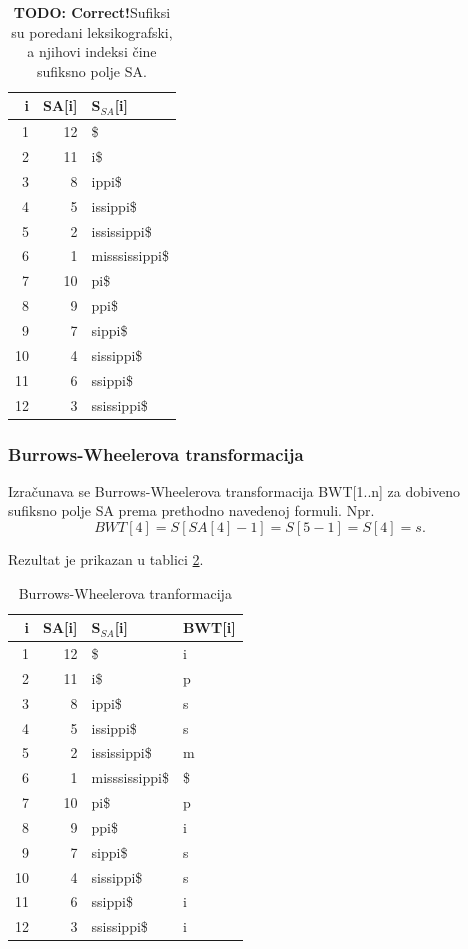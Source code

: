 \documentclass[a4paper,12pt]{article}
\begin{document}
\begin{enumerate}
	\begin{table}[h!]
		\caption{\textbf{TODO: Correct!}Sufiksi su poredani leksikografski, a njihovi indeksi čine sufiksno polje SA.}
		\label{tablePrimjer3}
		\begin{center}
			\begin{tabular}{rrl}
				\toprule
				i & SA[i] & S$_{SA}$[i] \\
				\midrule
				1 & 12 & \$ \\
				2 & 11 &  i\$ \\
				3 & 8 & ippi\$ \\
				4 & 5 & issippi\$ \\
				5 & 2 & ississippi\$ \\
				6 & 1 & misssissippi\$ \\
				7 & 10 & pi\$ \\
				8 & 9 & ppi\$ \\
				9 & 7 & sippi\$ \\
				10 & 4 & sissippi\$ \\
				11 & 6 & ssippi\$ \\
				12 & 3 & ssissippi\$ \\
				\bottomrule
			\end{tabular}
		\end{center}
	\end{table}
\end{enumerate}

\subsubsection{Burrows-Wheelerova transformacija}

Izračunava se Burrows-Wheelerova transformacija BWT[1..n] za dobiveno sufiksno polje SA prema prethodno navedenoj formuli.
Npr. $$BWT[4]=S[SA[4]-1]=S[5-1]=S[4]=s.$$

Rezultat je prikazan u tablici \ref{tableEx3}. 

\begin{table}[h!]
	\caption{Burrows-Wheelerova tranformacija}
	\label{tableEx3}
	\begin{center}
		\begin{tabular}{rrll}
			\toprule
			i & SA[i] & S$_{SA}$[i] & BWT[i] \\
			\midrule
			1 & 12 & \$ & i \\
			2 & 11 &  i\$ & p \\
			3 & 8 & ippi\$ & s \\
			4 & 5 & issippi\$ & s \\
			5 & 2 & ississippi\$ & m \\
			6 & 1 & misssissippi\$ & \$ \\
			7 & 10 & pi\$ & p \\
			8 & 9 & ppi\$ & i \\
			9 & 7 & sippi\$ & s \\
			10 & 4 & sissippi\$ & s \\
			11 & 6 & ssippi\$ & i \\
			12 & 3 & ssissippi\$ & i \\
			\bottomrule
		\end{tabular}
	\end{center}
\end{table}
\end{document}
